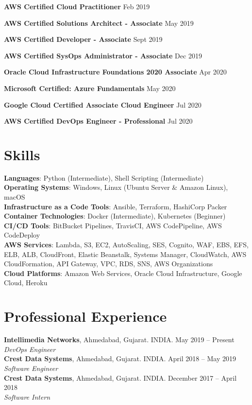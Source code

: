 \documentclass[margin,line]{res}
\begin{document}
\begin{resume}
{\bf AWS Certified Cloud Practitioner} \hfill{Feb 2019}

{\bf AWS Certified Solutions Architect - Associate} \hfill{May 2019}

{\bf AWS Certified Developer - Associate} \hfill{Sept 2019}

{\bf AWS Certified SysOps Administrator - Associate} \hfill{Dec 2019}

{\bf Oracle Cloud Infrastructure Foundations 2020 Associate} \hfill{Apr 2020}

{\bf Microsoft Certified: Azure Fundamentals} \hfill{May 2020}

{\bf Google Cloud Certified Associate Cloud Engineer} \hfill{Jul 2020}

{\bf AWS Certified DevOps Engineer - Professional} \hfill{Jul 2020}


\section{\sc Skills}
{\bf Languages}: Python (Intermediate), Shell Scripting (Intermediate)\\
{\bf Operating Systems}: Windows, Linux (Ubuntu Server \& Amazon Linux), macOS\\
{\bf Infrastructure as a Code Tools}: Ansible, Terraform, HashiCorp Packer\\
{\bf Container Technologies}: Docker (Intermediate), Kubernetes (Beginner)\\
{\bf CI/CD Tools}: BitBucket Pipelines, TravisCI, AWS CodePipeline, AWS CodeDeploy\\
{\bf AWS Services}: Lambda, S3, EC2, AutoScaling, SES, Cognito, WAF, EBS, EFS, ELB, ALB, CloudFront, Elastic Beanstalk, Systems Manager, CloudWatch, AWS CloudFormation, API Gateway, VPC, RDS, SNS, AWS Organizations\\
{\bf Cloud Platforms}: Amazon Web Services, Oracle Cloud Infrastructure, Google Cloud, Heroku\\

\section{\sc Professional Experience}
{\bf Intellimedia Networks}, Ahmedabad, Gujarat. INDIA. \hfill{May 2019 -- Present}\\
{\em DevOps Engineer}\\
{\bf Crest Data Systems}, Ahmedabad, Gujarat. INDIA. \hfill{April 2018 -- May 2019}\\
{\em Software Engineer}\\
{\bf Crest Data Systems}, Ahmedabad, Gujarat. INDIA. \hfill{December 2017 -- April 2018}\\
{\em Software Intern}\\
\\
\\

\end{resume}
\end{document}
